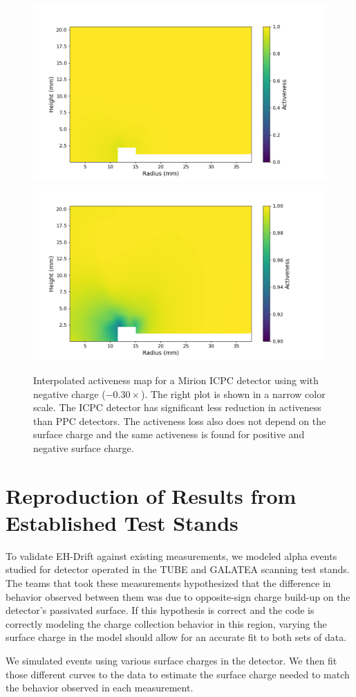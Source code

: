 \begin{figure}%
\centering
\includegraphics[trim={1.0cm 0cm 3.0cm 1cm},clip,width=0.49\linewidth]{ch5/figs/activeness_map_cubic_sc=-0.3_V07647A_5000_linear_full.png}
\includegraphics[trim={1.0cm 0cm 3cm 1cm},clip,width=0.49\linewidth]{ch5/figs/activeness_map_cubic_sc=-0.3_V07647A_5000_linear.png}
\caption{Interpolated activeness map for a Mirion ICPC detector using \ehd with negative charge ($-0.30\times${\scunit}). The right plot is shown in a narrow color scale. The ICPC detector has significant less reduction in activeness than PPC detectors. The activeness loss also does not depend on the surface charge and the same activeness is found for positive and negative surface charge.}
\label{ch5_fig_interpolated_icpc_activeness_map}
\end{figure}


\section{\label{res:1} Reproduction of Results from Established Test Stands}
To validate EH-Drift against existing measurements, we modeled alpha events studied for {\ponama} detector operated in the TUBE \cite{TUBE_paper} and GALATEA \cite{galatea_paper} scanning test stands. The teams that took these measurements hypothesized that the difference in behavior observed between them was due to opposite-sign charge build-up on the detector's passivated surface. If this hypothesis is correct and the {\ehd} code is correctly modeling the charge collection behavior in this region, varying the surface charge in the model should allow for an accurate fit to both sets of data.

We simulated events using various surface charges in the {\ponama} detector. We then fit those different curves to the data to estimate the surface charge needed to match the behavior observed in each measurement.

